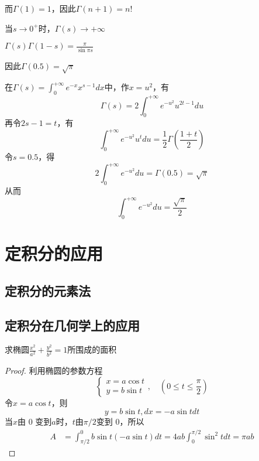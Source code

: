 \documentclass[11pt]{article}
\begin{document}
而\(\Gamma(1)=1\)，因此\(\Gamma(n+1)=n!\)

\begin{proposition}[]
当\(s\to0^+\)时，\(\Gamma(s)\to+\infty\)
\end{proposition}

\begin{proposition}[余元公式]
\(\Gamma(s)\Gamma(1-s)=\frac{\pi}{\sin\pi s}\)
\end{proposition}

因此\(\Gamma(0.5)=\sqrt{\pi}\)

在\(\Gamma(s)=\int_0^{+\infty}e^{-x}x^{s-1}dx\)中，作\(x=u^2\)，有
\begin{equation*}
\Gamma(s)=2\int_0^{+\infty}e^{-u^2}u^{2t-1}du
\end{equation*}
再令\(2s-1=t\)，有
\begin{equation*}
 \int_0^{+\infty}e^{-u^2}u^tdu=\frac{1}{2}\Gamma(\frac{1+t}{2})
\end{equation*}
令\(s=0.5\)，得
\begin{equation*}
2\int_0^{+\infty}e^{-u^2}du=\Gamma(0.5)=\sqrt{\pi}
\end{equation*}
从而
\begin{equation*}
\int_0^{+\infty}e^{-u^2}du=\frac{\sqrt{\pi}}{2}
\end{equation*}





\section{定积分的应用}
\label{sec:orge84184d}
\subsection{定积分的元素法}
\label{sec:orgd0b8979}
\subsection{定积分在几何学上的应用}
\label{sec:org9964361}
\begin{examplle}[]
求椭圆\(\frac{x^2}{a^2}+\frac{y^2}{b^2}=1\)所围成的面积
\end{examplle}

\begin{proof}
利用椭圆的参数方程
\begin{equation*}
\begin{cases}
x=a\cos t \\
y=b\sin t
\end{cases},\quad (0\le t\le\frac{\pi}{2})
\end{equation*}
令\(x=a\cos t\)，则
\begin{equation*}
y=b\sin t,dx=-a\sin t dt
\end{equation*}
当\(x\)由 0 变到\(a\)时，\(t\)由\(\pi/2\)变到 0，所以
\begin{align*}
A&=\int_{\pi/2}^0b\sin t(-a\sin t)dt=4ab\int_0^{\pi/2}\sin^2tdt=\pi ab
\end{align*}
\end{proof}
\end{document}

